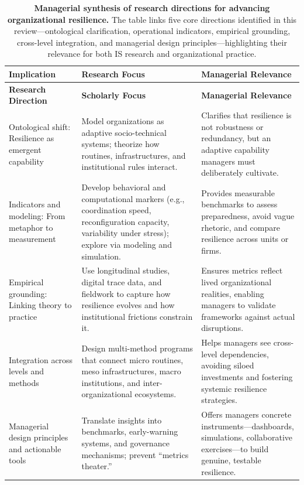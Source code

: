 \begin{table}[h!]
\centering
\label{tab:Implications}
\begin{tabular}{p{3cm} p{5cm} p{5cm}}
\hline
\textbf{Implication} & \textbf{Research Focus} & \textbf{Managerial Relevance} \\
\hline
\textbf{Research Direction} & \textbf{Scholarly Focus} & \textbf{Managerial Relevance} \\
\hline
Ontological shift: Resilience as emergent capability 
& Model organizations as adaptive socio-technical systems; theorize how routines, infrastructures, and institutional rules interact. 
& Clarifies that resilience is not robustness or redundancy, but an adaptive capability managers must deliberately cultivate. \\

Indicators and modeling: From metaphor to measurement 
& Develop behavioral and computational markers (e.g., coordination speed, reconfiguration capacity, variability under stress); explore via modeling and simulation. 
& Provides measurable benchmarks to assess preparedness, avoid vague rhetoric, and compare resilience across units or firms. \\

Empirical grounding: Linking theory to practice 
& Use longitudinal studies, digital trace data, and fieldwork to capture how resilience evolves and how institutional frictions constrain it. 
& Ensures metrics reflect lived organizational realities, enabling managers to validate frameworks against actual disruptions. \\

Integration across levels and methods 
& Design multi-method programs that connect micro routines, meso infrastructures, macro institutions, and inter-organizational ecosystems. 
& Helps managers see cross-level dependencies, avoiding siloed investments and fostering systemic resilience strategies. \\

Managerial design principles and actionable tools 
& Translate insights into benchmarks, early-warning systems, and governance mechanisms; prevent “metrics theater.” 
& Offers managers concrete instruments—dashboards, simulations, collaborative exercises—to build genuine, testable resilience. \\
\hline
\end{tabular}
\caption{\textbf{Managerial synthesis of research directions for advancing organizational resilience.} 
The table links five core directions identified in this review—ontological clarification, operational indicators, empirical grounding, cross-level integration, and managerial design principles—highlighting their relevance for both IS research and organizational practice.}
\label{tab:Implications}
\end{table}
